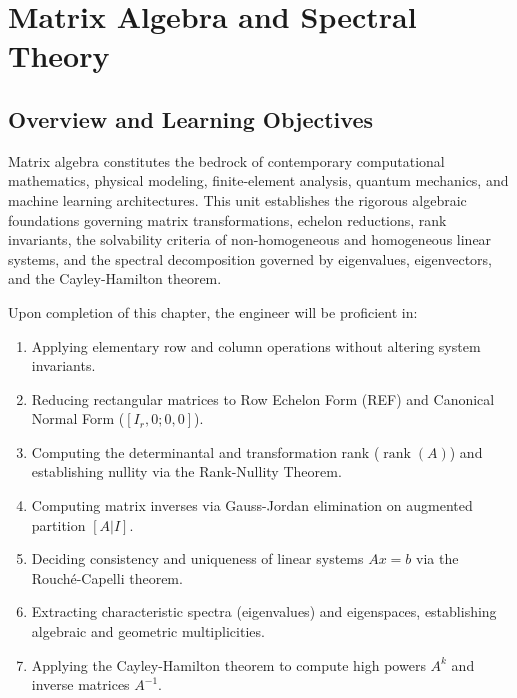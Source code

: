 \chapter{Matrix Algebra and Spectral Theory}
\label{chap:matrix-algebra}

\section{Overview and Learning Objectives}
Matrix algebra constitutes the bedrock of contemporary computational mathematics, physical modeling, finite-element analysis, quantum mechanics, and machine learning architectures. This unit establishes the rigorous algebraic foundations governing matrix transformations, echelon reductions, rank invariants, the solvability criteria of non-homogeneous and homogeneous linear systems, and the spectral decomposition governed by eigenvalues, eigenvectors, and the Cayley-Hamilton theorem.

\begin{important}
Upon completion of this chapter, the engineer will be proficient in:
\begin{enumerate}[leftmargin=1.5em]
    \item Applying elementary row and column operations without altering system invariants.
    \item Reducing rectangular matrices to Row Echelon Form (REF) and Canonical Normal Form ($[I_r, 0; 0, 0]$).
    \item Computing the determinantal and transformation rank ($\operatorname{rank}(A)$) and establishing nullity via the Rank-Nullity Theorem.
    \item Computing matrix inverses via Gauss-Jordan elimination on augmented partition $[A | I]$.
    \item Deciding consistency and uniqueness of linear systems $Ax = b$ via the Rouch\'e-Capelli theorem.
    \item Extracting characteristic spectra (eigenvalues) and eigenspaces, establishing algebraic and geometric multiplicities.
    \item Applying the Cayley-Hamilton theorem to compute high powers $A^k$ and inverse matrices $A^{-1}$.
\end{enumerate}
\end{important}

